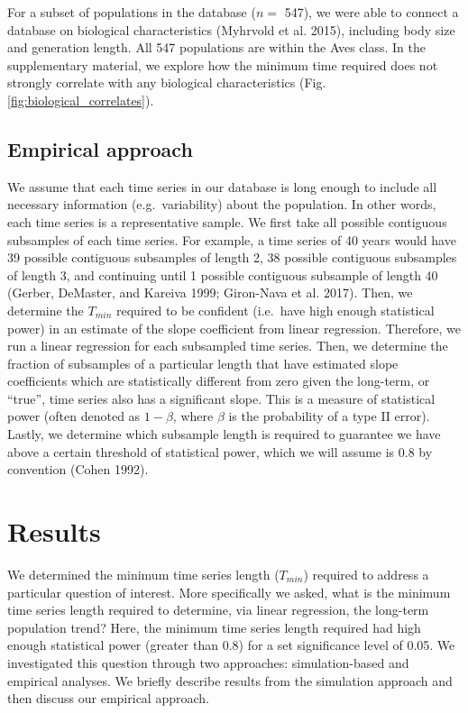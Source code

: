 \documentclass[12pt,]{article}
\begin{document}
For a subset of populations in the database (\(n =\) 547), we were able
to connect a database on biological characteristics (Myhrvold et al.
2015), including body size and generation length. All 547 populations
are within the Aves class. In the supplementary material, we explore how
the minimum time required does not strongly correlate with any
biological characteristics (Fig. \ref{fig:biological_correlates}).

\subsection{Empirical approach}\label{empirical-approach}

We assume that each time series in our database is long enough to
include all necessary information (e.g.~variability) about the
population. In other words, each time series is a representative sample.
We first take all possible contiguous subsamples of each time series.
For example, a time series of 40 years would have 39 possible contiguous
subsamples of length 2, 38 possible contiguous subsamples of length 3,
and continuing until 1 possible contiguous subsample of length 40
(Gerber, DeMaster, and Kareiva 1999; Giron-Nava et al. 2017). Then, we
determine the \(T_{min}\) required to be confident (i.e.~have high
enough statistical power) in an estimate of the slope coefficient from
linear regression. Therefore, we run a linear regression for each
subsampled time series. Then, we determine the fraction of subsamples of
a particular length that have estimated slope coefficients which are
statistically different from zero given the long-term, or ``true'', time
series also has a significant slope. This is a measure of statistical
power (often denoted as \(1 - \beta\), where \(\beta\) is the
probability of a type II error). Lastly, we determine which subsample
length is required to guarantee we have above a certain threshold of
statistical power, which we will assume is 0.8 by convention (Cohen
1992).

\section{Results}\label{results}

We determined the minimum time series length (\(T_{min}\)) required to
address a particular question of interest. More specifically we asked,
what is the minimum time series length required to determine, via linear
regression, the long-term population trend? Here, the minimum time
series length required had high enough statistical power (greater than
0.8) for a set significance level of 0.05. We investigated this question
through two approaches: simulation-based and empirical analyses. We
briefly describe results from the simulation approach and then discuss
our empirical approach.
\end{document}
